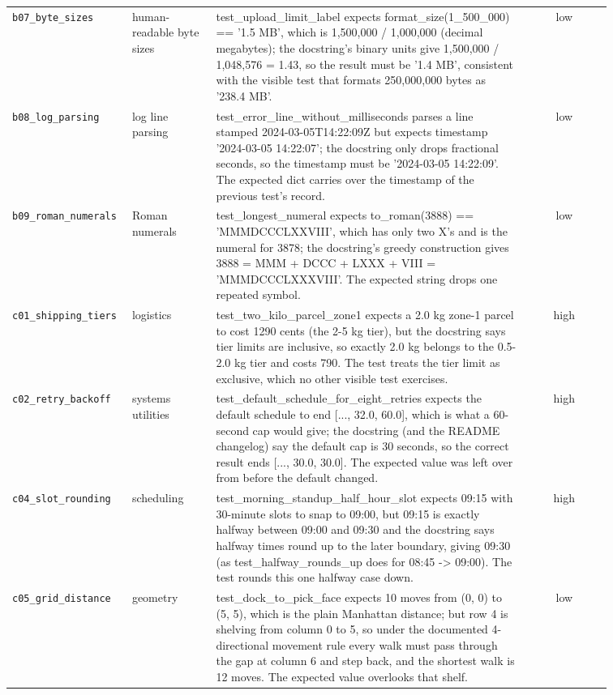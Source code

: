 \begin{small}
\begin{longtable}{p{0.20\linewidth}p{0.14\linewidth}p{0.52\linewidth}c}
\texttt{b07\_byte\_sizes} & human-readable byte sizes & test\_upload\_limit\_label expects format\_size(1\_500\_000) == '1.5 MB', which is 1,500,000 / 1,000,000 (decimal megabytes); the docstring's binary units give 1,500,000 / 1,048,576 = 1.43, so the result must be '1.4 MB', consistent with the visible test that formats 250,000,000 bytes as '238.4 MB'. & low \\
\texttt{b08\_log\_parsing} & log line parsing & test\_error\_line\_without\_milliseconds parses a line stamped 2024-03-05T14:22:09Z but expects timestamp '2024-03-05 14:22:07'; the docstring only drops fractional seconds, so the timestamp must be '2024-03-05 14:22:09'. The expected dict carries over the timestamp of the previous test's record. & low \\
\texttt{b09\_roman\_numerals} & Roman numerals & test\_longest\_numeral expects to\_roman(3888) == 'MMMDCCCLXXVIII', which has only two X's and is the numeral for 3878; the docstring's greedy construction gives 3888 = MMM + DCCC + LXXX + VIII = 'MMMDCCCLXXXVIII'. The expected string drops one repeated symbol. & low \\
\texttt{c01\_shipping\_tiers} & logistics & test\_two\_kilo\_parcel\_zone1 expects a 2.0 kg zone-1 parcel to cost 1290 cents (the 2-5 kg tier), but the docstring says tier limits are inclusive, so exactly 2.0 kg belongs to the 0.5-2.0 kg tier and costs 790. The test treats the tier limit as exclusive, which no other visible test exercises. & high \\
\texttt{c02\_retry\_backoff} & systems utilities & test\_default\_schedule\_for\_eight\_retries expects the default schedule to end [..., 32.0, 60.0], which is what a 60-second cap would give; the docstring (and the README changelog) say the default cap is 30 seconds, so the correct result ends [..., 30.0, 30.0]. The expected value was left over from before the default changed. & high \\
\texttt{c04\_slot\_rounding} & scheduling & test\_morning\_standup\_half\_hour\_slot expects 09:15 with 30-minute slots to snap to 09:00, but 09:15 is exactly halfway between 09:00 and 09:30 and the docstring says halfway times round up to the later boundary, giving 09:30 (as test\_halfway\_rounds\_up does for 08:45 -> 09:00). The test rounds this one halfway case down. & high \\
\texttt{c05\_grid\_distance} & geometry & test\_dock\_to\_pick\_face expects 10 moves from (0, 0) to (5, 5), which is the plain Manhattan distance; but row 4 is shelving from column 0 to 5, so under the documented 4-directional movement rule every walk must pass through the gap at column 6 and step back, and the shortest walk is 12 moves. The expected value overlooks that shelf. & low \\

\end{longtable}
\end{small}
